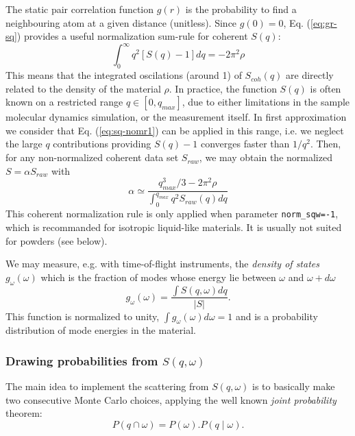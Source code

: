 The static pair correlation function $g(r)$ is the probability to find a neighbouring atom at a given distance (unitless). Since $g(0) = 0$, Eq. (\ref{eq:gr-sq}) provides a useful normalization sum-rule for coherent $S(q)$:
\begin{equation}
\label{eq:sq-nomr1}
\int_0^\infty q^2 [S(q) - 1] dq = -2\pi^2\rho
\end{equation}
This means that the integrated oscilations (around 1) of $S_{coh}(q)$ are directly related to the density of the material $\rho$.
In practice, the function $S(q)$ is often known on a restricted range $q \in [0, q_{max} ]$, due to either limitations in the sample molecular dynamics simulation, or the measurement itself.
In first approximation we consider that Eq. (\ref{eq:sq-nomr1}) can be applied in this range, i.e. we neglect the large $q$ contributions providing $S(q)-1$ converges faster than $1/q^2$. Then, for any non-normalized coherent data set $S_{raw}$, we may obtain the normalized $S = \alpha S_{raw}$ with \cite{fischer05}
\begin{equation}
\label{eq:sq-nomr2}
\alpha \simeq \frac{q^3_{max}/3 - 2\pi^2 \rho}{\int_0^{q_{max}} q^2 S_{raw}(q) dq }
\end{equation}
This coherent normalization rule is only applied when parameter \verb+norm_sqw=-1+, which is recommanded for isotropic liquid-like materials. It is usually not suited for powders (see below).

We may measure, e.g. with time-of-flight instruments, the \emph{density of states} $g_{\omega}(\omega)$  which is the fraction of modes whose energy lie between $\omega$ and $\omega+d\omega$ \cite{lovesey84}
\begin{equation}
g_{\omega}(\omega) = \frac{\int S(q,\omega) dq}{|S|} .
\end{equation}
This function is normalized to unity, $\int g_{\omega}(\omega) d\omega = 1$ and is a probability distribution of mode energies in the material.

\subsubsection{Drawing probabilities from $S(q, \omega)$}

The main idea to implement the scattering from $S(q, \omega)$ is to basically make two consecutive Monte Carlo choices, applying the well known \emph{joint probability} theorem:
\begin{equation}
\label{eq:jointproba}
P(q \cap \omega) = P(\omega).P(q \mid \omega) .
\end{equation}

